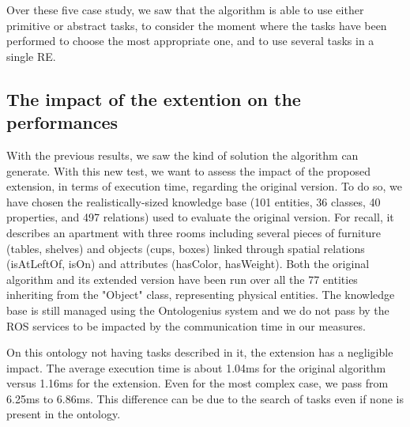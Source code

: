 Over these five case study, we saw that the algorithm is able to use either primitive or abstract tasks, to consider the moment where the tasks have been performed to choose the most appropriate one, and to use several tasks in a single RE.

\subsection{The impact of the extention on the performances}

With the previous results, we saw the kind of solution the algorithm can generate. With this new test, we want to assess the impact of the proposed extension, in terms of execution time, regarding the original version. To do so, we have chosen the realistically-sized knowledge base (101 entities, 36 classes, 40 properties, and 497 relations) used to evaluate the original version. For recall, it describes an apartment with three rooms including several pieces of furniture (tables, shelves) and objects (cups, boxes) linked through spatial relations (isAtLeftOf, isOn) and attributes (hasColor, hasWeight). Both the original algorithm and its extended version have been run over all the 77 entities inheriting from the "Object" class, representing physical entities. The knowledge base is still managed using the Ontologenius system and we do not pass by the ROS services to be impacted by the communication time in our measures.

On this ontology not having tasks described in it, the extension has a negligible impact. The average execution time is about 1.04ms for the original algorithm versus 1.16ms for the extension. Even for the most complex case, we pass from 6.25ms to 6.86ms. This difference can be due to the search of tasks even if none is present in the ontology.

